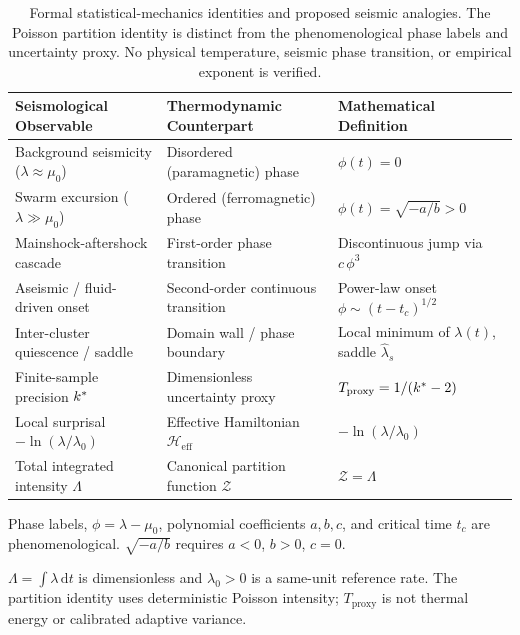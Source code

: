 \begin{table}[htbp]
  \centering
  \small
  \begin{threeparttable}
    \caption{Formal statistical-mechanics identities and proposed seismic
      analogies. The Poisson partition identity is distinct from the
      phenomenological phase labels and uncertainty proxy. No physical
    temperature, seismic phase transition, or empirical exponent is verified.}
    \label{tab:thermo_correspondence}
    \begin{tabularx}{\linewidth}{>{\raggedright\arraybackslash}X
      >{\raggedright\arraybackslash}X >{\raggedright\arraybackslash}X}
      \toprule
      \textbf{Seismological Observable} & \textbf{Thermodynamic
      Counterpart} & \textbf{Mathematical Definition} \\
      \midrule
      Background seismicity ($\lambda \approx \mu_0$) & Disordered
      (paramagnetic) phase & $\phi(t) = 0$ \\
      Swarm excursion ($\lambda \gg \mu_0$) & Ordered (ferromagnetic)
      phase & $\phi(t) = \sqrt{-a/b} > 0$ \\
      Mainshock-aftershock cascade & First-order phase transition &
      Discontinuous jump via $c\,\phi^3$ \\
      Aseismic / fluid-driven onset & Second-order continuous
      transition & Power-law onset $\phi \sim (t - t_c)^{1/2}$ \\
      Inter-cluster quiescence / saddle & Domain wall / phase boundary
      & Local minimum of $\lambda(t)$, saddle $\hat{\lambda}_s$ \\
      Finite-sample precision $k^{*}$ & Dimensionless uncertainty
      proxy & $T_{\mathrm{proxy}} = 1/(k^{*} - 2)$ \\
      Local surprisal $-\ln(\lambda/\lambda_0)$ & Effective
      Hamiltonian $\mathcal{H}_{\mathrm{eff}}$ &
      $-\ln(\lambda/\lambda_0)$ \\
      Total integrated intensity $\Lambda$ & Canonical partition
      function $\mathcal{Z}$ & $\mathcal{Z}=\Lambda$ \\
      \bottomrule
    \end{tabularx}
    \begin{tablenotes}[flushleft]
      \footnotesize
    \item [Model / Hypothesis] Phase labels, $\phi=\lambda-\mu_0$,
      polynomial coefficients $a,b,c$, and critical time $t_c$ are
      phenomenological. $\sqrt{-a/b}$ requires $a<0$, $b>0$, $c=0$.
    \item [Derived Identity] $\Lambda=\int\lambda\,\mathrm{d}t$ is
      dimensionless and $\lambda_0>0$ is a same-unit reference rate.
      The partition identity uses deterministic Poisson intensity;
      $T_{\mathrm{proxy}}$ is not thermal energy or calibrated
      adaptive variance.
    \end{tablenotes}
  \end{threeparttable}
\end{table}

